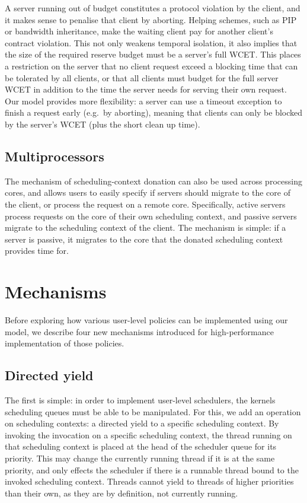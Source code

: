 A server running out of budget constitutes a protocol violation
by the client, and it makes sense to penalise that
client by aborting. Helping schemes, such as \gls{PIP} or bandwidth
inheritance,
make the waiting client pay for
another client's contract violation. This not only weakens temporal isolation,
it also implies that the size of the required reserve budget
must be a server's full WCET. This places a restriction on the server
that no client request exceed a blocking time that can be tolerated by
all clients, or that all clients must budget for the full server WCET in
addition to the time the server needs for serving their own request.
Our model provides more flexibility: a server can use a timeout
exception to finish a request early (e.g.\ by aborting), meaning that clients can only be
blocked by the server's \gls{WCET} (plus the short
clean up time).

\subsection{Multiprocessors}

The mechanism of scheduling-context donation can also be used across processing cores, and 
allows users to easily specify if servers should migrate to the core of the client, or 
process the request on a remote core. Specifically, active servers process requests on the core of
their own scheduling context, and passive servers migrate to the scheduling context of the client. 
The mechanism is simple: if a
server is passive, it migrates to the core that the donated scheduling context provides time for. 

\section{Mechanisms}
\label{sec:model-mechanisms}

Before exploring how various user-level policies can be implemented using our model, we describe
four new mechanisms introduced for high-performance implementation of those policies.

\subsection{Directed yield}

The first is simple: in order to implement user-level schedulers, the kernels scheduling queues
must be able to be manipulated. For this, we add an operation on scheduling contexts: a
directed yield to a specific scheduling context. By invoking the  invocation on 
a specific scheduling context, the thread running on that scheduling context is placed at the head
of the scheduler queue for its priority. 
This may change the currently running thread if it is at the same priority, and only effects the
scheduler if there is a runnable thread bound to the invoked scheduling context. Threads cannot
yield to threads of higher priorities than their own, as they are by definition, not currently
running.

